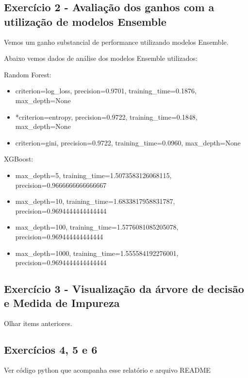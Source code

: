 \documentclass[11pt]{article}
\begin{document}
\subsection{Exercício 2 - Avaliação dos ganhos com a utilização de modelos Ensemble}
Vemos um ganho substancial de performance utilizando modelos Ensemble.

Abaixo vemos dados de análise dos modelos Ensemble utilizados:

Random Forest:\\
\begin{itemize}
  \item criterion=log\_loss, precision=0.9701, training\_time=0.1876, max\_depth=None
  \item *criterion=entropy, precision=0.9722, training\_time=0.1848, max\_depth=None
  \item criterion=gini, precision=0.9722, training\_time=0.0960, max\_depth=None
\end{itemize}

XGBoost:\\
\begin{itemize}
  \item max\_depth=5, training\_time=1.5073583126068115, precision=0.9666666666666667 
  \item max\_depth=10, training\_time=1.6833817958831787, precision=0.9694444444444444
  \item max\_depth=100, training\_time=1.5776081085205078, precision=0.969444444444444 
  \item max\_depth=1000, training\_time=1.555584192276001, precision=0.9694444444444444
\end{itemize}

\subsection{Exercício 3 - Visualização da árvore de decisão e Medida de Impureza}
Olhar items anteriores.

\subsection{Exercícios 4, 5 e 6}
Ver código python que acompanha esse relatório e arquivo README

\end{document}
